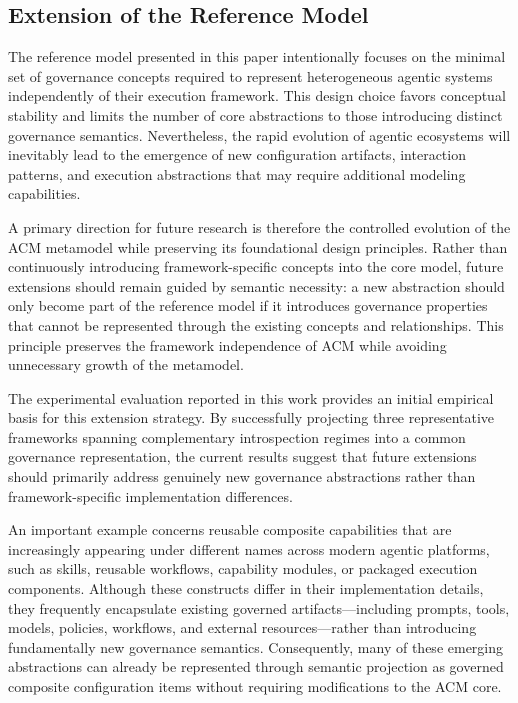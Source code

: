 \documentclass[10pt]{article}
\begin{document}
\subsection{Extension of the Reference Model}
\label{sec:future_reference_model}

The reference model presented in this paper intentionally focuses on the minimal set of governance concepts required to represent heterogeneous agentic systems independently of their execution framework. This design choice favors conceptual stability and limits the number of core abstractions to those introducing distinct governance semantics. Nevertheless, the rapid evolution of agentic ecosystems will inevitably lead to the emergence of new configuration artifacts, interaction patterns, and execution abstractions that may require additional modeling capabilities.

A primary direction for future research is therefore the controlled evolution of the ACM metamodel while preserving its foundational design principles. Rather than continuously introducing framework-specific concepts into the core model, future extensions should remain guided by semantic necessity: a new abstraction should only become part of the reference model if it introduces governance properties that cannot be represented through the existing concepts and relationships. This principle preserves the framework independence of ACM while avoiding unnecessary growth of the metamodel.

The experimental evaluation reported in this work provides an initial empirical basis for this extension strategy. By successfully projecting three representative frameworks spanning complementary introspection regimes into a common governance representation, the current results suggest that future extensions should primarily address genuinely new governance abstractions rather than framework-specific implementation differences.

An important example concerns reusable composite capabilities that are increasingly appearing under different names across modern agentic platforms, such as skills, reusable workflows, capability modules, or packaged execution components. Although these constructs differ in their implementation details, they frequently encapsulate existing governed artifacts—including prompts, tools, models, policies, workflows, and external resources—rather than introducing fundamentally new governance semantics. Consequently, many of these emerging abstractions can already be represented through semantic projection as governed composite configuration items without requiring modifications to the ACM core.
\end{document}
